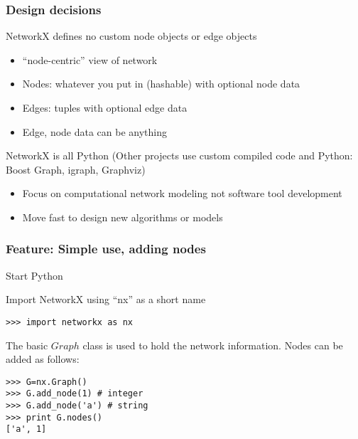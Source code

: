 \begin{frame}[fragile]
\frametitle{Design decisions}

\begin{block}
{NetworkX defines no custom node objects or edge objects}

\begin{itemize}
\item ``node-centric'' view of network

\item Nodes: whatever you put in (hashable) with optional node data

\item Edges: tuples with optional edge data

\item Edge, node data can be anything

\end{itemize}
\end{block}

\begin{block}
{NetworkX is all Python}
(Other projects use custom compiled code and Python: Boost Graph,
  igraph, Graphviz)

\begin{itemize}
\item Focus on computational network modeling not software tool development

\item Move fast to design new algorithms or models


\end{itemize}
\end{block}


\end{frame}



\begin{frame}[fragile]
\frametitle{Feature: Simple use, adding nodes}

Start Python

Import NetworkX using ``nx'' as a short name
\begin{block}{}
\begin{verbatim}
>>> import networkx as nx
\end{verbatim}
\end{block}
The basic $Graph$ class is used to hold the network information.
Nodes can be added as follows:
\begin{block}{}
\begin{verbatim}
>>> G=nx.Graph()
>>> G.add_node(1) # integer
>>> G.add_node('a') # string
>>> print G.nodes()
['a', 1]
\end{verbatim}
\end{block}

\end{frame}



